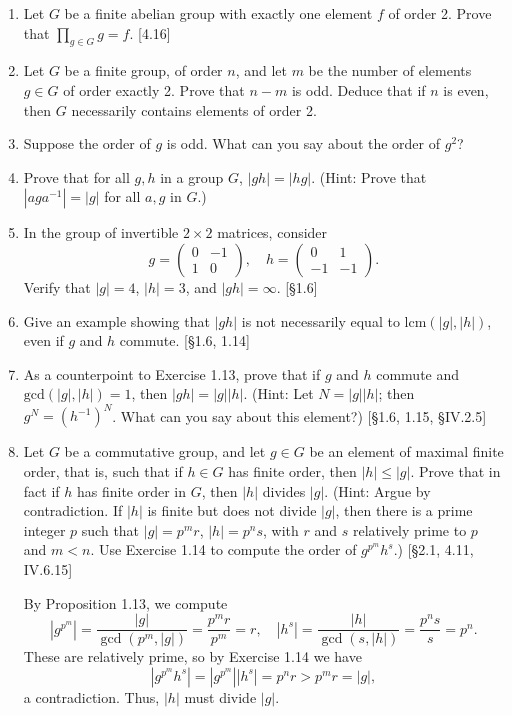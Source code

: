 \begin{enumerate}
    \item Let $G$ be a finite abelian group with exactly one element $f$ of order 2. Prove that $\prod_{g \in G} g = f$. [4.16]

    \item Let $G$ be a finite group, of order $n$, and let $m$ be the number of elements $g \in G$ of order exactly 2. Prove that $n-m$ is odd. Deduce that if $n$ is even, then $G$ necessarily contains elements of order 2.

    \item Suppose the order of $g$ is odd. What can you say about the order of $g^2$?

    \item Prove that for all $g, h$ in a group $G$, $|gh| = |hg|$. (Hint: Prove that $|aga^{-1}| = |g|$ for all $a, g$ in $G$.)

    \item In the group of invertible $2 \times 2$ matrices, consider
          \[
              g = \begin{pmatrix} 0 & -1 \\ 1 & 0 \end{pmatrix}, \quad h = \begin{pmatrix} 0 & 1 \\ -1 & -1 \end{pmatrix}.
          \]
          Verify that $|g|=4$, $|h|=3$, and $|gh|=\infty$. [\S1.6]

    \item Give an example showing that $|gh|$ is not necessarily equal to $\text{lcm}(|g|,|h|)$, even if $g$ and $h$ commute. [\S1.6, 1.14]

    \item {
          As a counterpoint to Exercise 1.13, prove that if $g$ and $h$ commute and $\text{gcd}(|g|, |h|) =1$, then $|gh| = |g||h|$. (Hint: Let $N = |g||h|$; then $g^N = (h^{-1})^N$. What can you say about this element?) [\S1.6, 1.15, \S IV.2.5]
          \par}


    \item Let $G$ be a commutative group, and let $g \in G$ be an element of maximal finite order, that is, such that if $h \in G$ has finite order, then $|h| \le |g|$. Prove that in fact if $h$ has finite order in $G$, then $|h|$ divides $|g|$. (Hint: Argue by contradiction. If $|h|$ is finite but does not divide $|g|$, then there is a prime integer $p$ such that $|g| = p^m r$, $|h| = p^n s$, with $r$ and $s$ relatively prime to $p$ and $m < n$. Use Exercise 1.14 to compute the order of $g^{p^m} h^s$.) [\S2.1, 4.11, IV.6.15]
          \begin{solution}
              By Proposition 1.13, we compute \[ |g^{p^m}| = \frac{|g|}{\gcd(p^m, |g|)} = \frac{p^m r}{p^m} = r, \quad |h^s| = \frac{|h|}{\gcd(s, |h|)} = \frac{p^n s}{s} = p^n. \]
              These are relatively prime, so by Exercise 1.14 we have \[ |g^{p^m} h^s| = |g^{p^m}||h^s| = p^n r > p^m r = |g|, \] a contradiction. Thus, $|h|$ must divide $|g|$.
          \end{solution}
\end{enumerate}